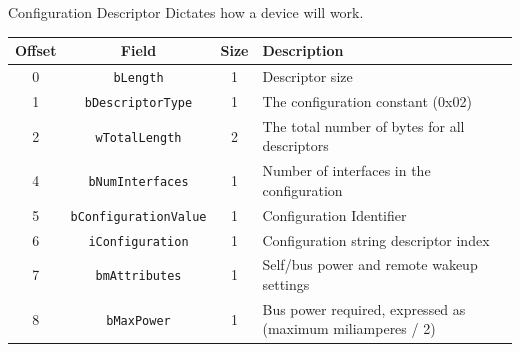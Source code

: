 \documentclass[pdf]{beamer}
\begin{document}
\begin{frame}{Configuration Descriptor}
  \transdissolve
  Dictates how a device will work.
  \begin{table}
    \tiny
    \begin{tabular}{| c | c | c | l |}
      \hline
      \textbf{Offset} & \textbf{Field} & \textbf{Size} & \textbf{Description} \\ \hline \hline
      0 & \texttt{bLength} & 1 & Descriptor size \\ \hline
      1 & \texttt{bDescriptorType} & 1 & The configuration constant (0x02) \\ \hline
      2 & \texttt{wTotalLength} & 2 & The total number of bytes for all descriptors \\ \hline
      4 & \texttt{bNumInterfaces} & 1 & Number of interfaces in the configuration \\ \hline
      5 & \texttt{bConfigurationValue} & 1 & Configuration Identifier \\ \hline
      6 & \texttt{iConfiguration} & 1 & Configuration string descriptor index \\ \hline
      7 & \texttt{bmAttributes} & 1 & Self/bus power and remote wakeup settings \\ \hline
      8 & \texttt{bMaxPower} & 1 & Bus power required, expressed as (maximum miliamperes / 2) \\ \hline
    \end{tabular}
  \end{table}
\end{frame}
\end{document}
